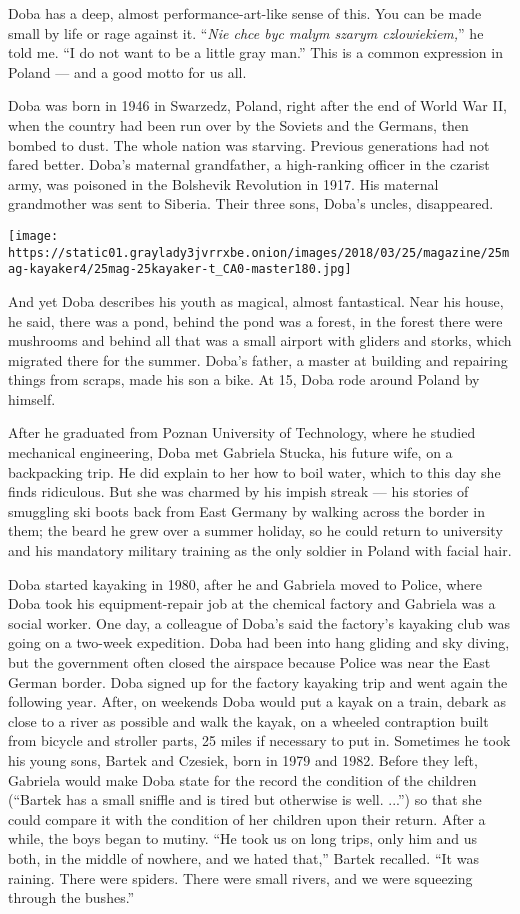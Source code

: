 Doba has a deep, almost performance-art-like sense of this. You can be
made small by life or rage against it. ``\emph{Nie chce byc malym szarym
czlowiekiem,}'' he told me. ``I do not want to be a little gray man.''
This is a common expression in Poland --- and a good motto for us all.

Doba was born in 1946 in Swarzedz, Poland, right after the end of World
War II, when the country had been run over by the Soviets and the
Germans, then bombed to dust. The whole nation was starving. Previous
generations had not fared better. Doba's maternal grandfather, a
high-ranking officer in the czarist army, was poisoned in the Bolshevik
Revolution in 1917. His maternal grandmother was sent to Siberia. Their
three sons, Doba's uncles, disappeared.

\texttt{[image: https://static01.graylady3jvrrxbe.onion/images/2018/03/25/magazine/25mag-kayaker4/25mag-25kayaker-t\_CA0-master180.jpg]}

And yet Doba describes his youth as magical, almost fantastical. Near
his house, he said, there was a pond, behind the pond was a forest, in
the forest there were mushrooms and behind all that was a small airport
with gliders and storks, which migrated there for the summer. Doba's
father, a master at building and repairing things from scraps, made his
son a bike. At 15, Doba rode around Poland by himself.

After he graduated from Poznan University of Technology, where he
studied mechanical engineering, Doba met Gabriela Stucka, his future
wife, on a backpacking trip. He did explain to her how to boil water,
which to this day she finds ridiculous. But she was charmed by his
impish streak --- his stories of smuggling ski boots back from East
Germany by walking across the border in them; the beard he grew over a
summer holiday, so he could return to university and his mandatory
military training as the only soldier in Poland with facial hair.

Doba started kayaking in 1980, after he and Gabriela moved to Police,
where Doba took his equipment-repair job at the chemical factory and
Gabriela was a social worker. One day, a colleague of Doba's said the
factory's kayaking club was going on a two-week expedition. Doba had
been into hang gliding and sky diving, but the government often closed
the airspace because Police was near the East German border. Doba signed
up for the factory kayaking trip and went again the following year.
After, on weekends Doba would put a kayak on a train, debark as close to
a river as possible and walk the kayak, on a wheeled contraption built
from bicycle and stroller parts, 25 miles if necessary to put in.
Sometimes he took his young sons, Bartek and Czesiek, born in 1979 and
1982. Before they left, Gabriela would make Doba state for the record
the condition of the children (``Bartek has a small sniffle and is tired
but otherwise is well. ...'') so that she could compare it with the
condition of her children upon their return. After a while, the boys
began to mutiny. ``He took us on long trips, only him and us both, in
the middle of nowhere, and we hated that,'' Bartek recalled. ``It was
raining. There were spiders. There were small rivers, and we were
squeezing through the bushes.''

